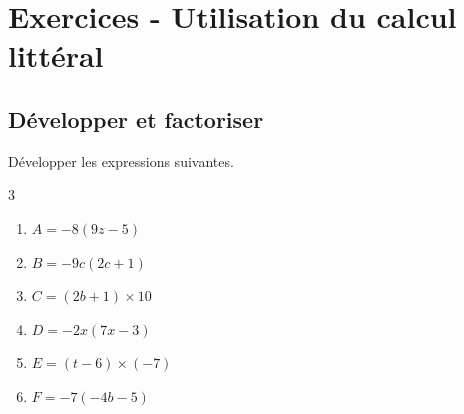 \section*{Exercices - Utilisation du calcul littéral}
{\setlength{\columnseprule}{0pt}
\setcounter{NumEx}{1}

\subsection*{Développer et factoriser}



\begin{Exercice} %
Développer les expressions suivantes.
\vspace{-0.5cm}
\begin{multicols}{3}
\begin{enumerate}[itemsep=2em,label={}]
	\item \begin{minipage}[t]{\linewidth}$A=-8(9z-5)$\end{minipage}
	\item \begin{minipage}[t]{\linewidth}$B=-9c(2c+1)$\end{minipage}
	\item \begin{minipage}[t]{\linewidth}$C=(2b+1)\times 10$\end{minipage}
	\item \begin{minipage}[t]{\linewidth}$D=-2x(7x-3)$\end{minipage}
	\item \begin{minipage}[t]{\linewidth}$E=(t-6)\times (-7)$\end{minipage}
	\item \begin{minipage}[t]{\linewidth}$F=-7(-4b-5)$\end{minipage}
\end{enumerate}
\end{multicols}
\end{Exercice}

}
